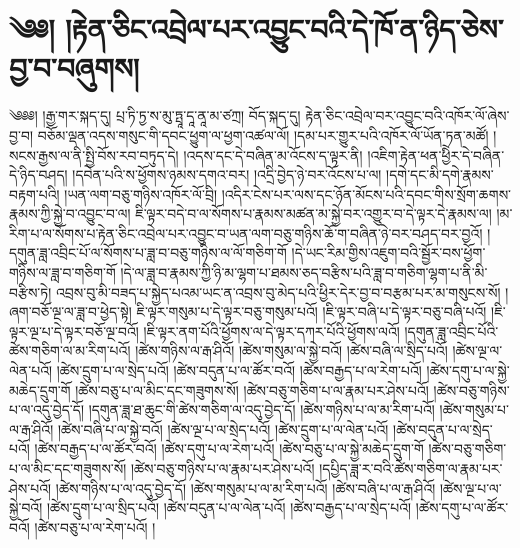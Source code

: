 \chapter{༄༅། །རྟེན་ཅིང་འབྲེལ་པར་འབྱུང་བའི་དེ་ཁོ་ན་ཉིད་ཅེས་བྱ་བ་བཞུགས།}༄༅༅། །རྒྱ་གར་སྐད་དུ། པྲ་ཏི་ཏྱ་ས་མུ་ཏྤཱ་དཱ་ནཱ་མ་ཙཀྲ། བོད་སྐད་དུ། རྟེན་ཅིང་འབྲེལ་བར་འབྱུང་བའི་འཁོར་ལོ་ཞེས་བྱ་བ། བཅོམ་ལྡན་འདས་གསུང་གི་དབང་ཕྱུག་ལ་ཕྱག་འཚལ་ལོ། །དམ་པར་གྱུར་པའི་འཁོར་ལོ་ཡོན་ཏན་མཚོ། །སངས་རྒྱས་ལ་ནི་སྤྱི་བོས་རབ་བཏུད་དེ། །འདས་དང་དེ་བཞིན་མ་འོངས་ད་ལྟར་ནི། །འཇིག་རྟེན་ཕན་ཕྱིེར་དེ་བཞིན་དེ་ཉིད་བཤད། །དབེན་པའི་ས་ཕྱོགས་ཉམས་དགའ་བར། །འདྲི་བྱེད་ཉེ་བར་འོངས་པ་ལ། །དགེ་དང་མི་དགེ་རྣམས་བརྟག་པའི། །ཡན་ལག་བཅུ་གཉིས་འཁོར་ལོ་བྲི། །འདིར་ངེས་པར་ལས་དང་ཉོན་མོངས་པའི་དབང་གིས་སྲོག་ཆགས་རྣམས་ཀྱི་སྐྱེ་བ་འབྱུང་བ་ལ། ཇི་ལྟར་བདེ་བ་ལ་སོགས་པ་རྣམས་མཚན་མ་སྐྱེ་བར་འགྱུར་བ་དེ་ལྟར་དེ་རྣམས་ལ། །མ་རིག་པ་ལ་སོགས་པ་རྟེན་ཅིང་འབྲེལ་པར་འབྱུང་བ་ཡན་ལག་བཅུ་གཉིས་ཆོ་ག་བཞིན་ཉེ་བར་བཤད་བར་བྱའོ། །དགུན་ཟླ་འབྲིང་པོ་ལ་སོགས་པ་ཟླ་བ་བཅུ་གཉིས་ལ་ལོ་གཅིག་གོ །དེ་ཡང་རིམ་གྱིས་འཇུག་བའི་སྦྱོར་བས་ཕྱོག་གཉིས་ལ་ཟླ་བ་གཅིག་གོ །དེ་ལ་ཟླ་བ་རྣམས་ཀྱི་ཉི་མ་ལྷག་པ་ཐམས་ཅད་བརྩིས་པའི་ཟླ་བ་གཅིག་ལྷག་པ་ནི་མི་བརྩིས་ཏེ། འབྲས་བུ་མི་བཟད་པ་སྐྱེད་པའམ་ཡང་ན་འབྲས་བུ་མེད་པའི་ཕྱིར་དེར་བྱ་བ་བརྩམ་པར་མ་གསུངས་སོ། །ཞག་བཅོ་ལྔ་ལ་ཟླ་བ་ཕྱེད་སྟེ། ཇི་ལྟར་གསུམ་པ་དེ་ལྟར་བཅུ་གསུམ་པའོ། །ཇི་ལྟར་བཞི་པ་དེ་ལྟར་བཅུ་བཞི་པའོ། །ཇི་ལྟར་ལྔ་པ་དེ་ལྟར་བཅོ་ལྔ་བའོ། །ཇི་ལྟར་ནག་པོའི་ཕྱོགས་ལ་དེ་ལྟར་དཀར་པོའི་ཕྱོགས་ལའོ། །དགུན་ཟླ་འབྲིང་པོའི་ཚེས་གཅིག་ལ་མ་རིག་པའོ། །ཚེས་གཉིས་ལ་རྒ་ཤིའོ། །ཚེས་གསུམ་ལ་སྐྱེ་བའོ། །ཚེས་བཞི་ལ་སྲིད་པའོ། །ཚེས་ལྔ་ལ་ལེན་པའོ། །ཚེས་དྲུག་པ་ལ་སྲེད་པའོ། །ཚེས་བདུན་པ་ལ་ཚོར་བའོ། །ཚེས་བརྒྱད་པ་ལ་རེག་པའོ། །ཚེས་དགུ་པ་ལ་སྐྱེ་མཆེད་དྲུག་གོ །ཚེས་བཅུ་པ་ལ་མིང་དང་གཟུགས་སོ། །ཚེས་བཅུ་གཅིག་པ་ལ་རྣམ་པར་ཤེས་པའོ། །ཚེས་བཅུ་གཉིས་པ་ལ་འདུ་བྱེད་དོ། །དགུན་ཟླ་ཐ་ཆུང་གི་ཚེས་གཅིག་ལ་འདུ་བྱེད་དོ། །ཚེས་གཉིས་པ་ལ་མ་རིག་པའོ། །ཚེས་གསུམ་པ་ལ་རྒ་ཤིའོ། །ཚེས་བཞི་པ་ལ་སྐྱེ་བའོ། །ཚེས་ལྔ་པ་ལ་སྲེད་པའོ། །ཚེས་དྲུག་པ་ལ་ལེན་པའོ། །ཚེས་བདུན་པ་ལ་སྲེད་པའོ། །ཚེས་བརྒྱད་པ་ལ་ཚོར་བའོ། །ཚེས་དགུ་པ་ལ་རེག་པའོ། །ཚེས་བཅུ་པ་ལ་སྐྱེ་མཆེད་དྲུག་གོ །ཚེས་བཅུ་གཅིག་པ་ལ་མིང་དང་གཟུགས་སོ། །ཚེས་བཅུ་གཉིས་པ་ལ་རྣམ་པར་ཤེས་པའོ། །དཔྱིད་ཟླ་ར་བའི་ཚེས་གཅིག་ལ་རྣམ་པར་ཤེས་པའོ། །ཚེས་གཉིས་པ་ལ་འདུ་བྱེད་དོ། །ཚེས་གསུམ་པ་ལ་མ་རིག་པའོ། །ཚེས་བཞི་པ་ལ་རྒ་ཤིའོ། །ཚེས་ལྔ་པ་ལ་སྐྱེ་བའོ། །ཚེས་དྲུག་པ་ལ་སྲིད་པའོ། །ཚེས་བདུན་པ་ལ་ལེན་པའོ། །ཚེས་བརྒྱད་པ་ལ་སྲེད་པའོ། །ཚེས་དགུ་པ་ལ་ཚོར་བའོ། །ཚེས་བཅུ་པ་ལ་རེག་པའོ། །

